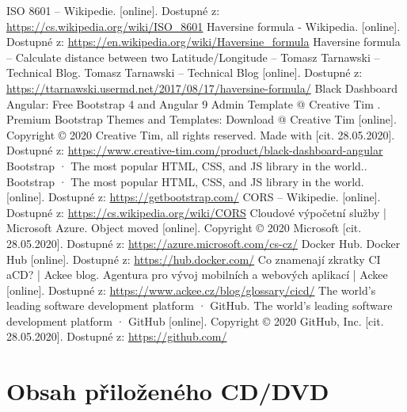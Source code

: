 \documentclass[
  glossaries,
]{kidiplom}
\begin{document}
\begin{thebibliography}{9}
     ISO 8601 – Wikipedie. [online]. Dostupné z: \url{https://cs.wikipedia.org/wiki/ISO\_8601}
     Haversine formula - Wikipedia. [online]. Dostupné z: \url{https://en.wikipedia.org/wiki/Haversine\_formula}
     Haversine formula – Calculate distance between two Latitude/Longitude – Tomasz Tarnawski – Technical Blog. Tomasz Tarnawski – Technical Blog [online]. Dostupné z: \url{https://ttarnawski.usermd.net/2017/08/17/haversine-formula/}
     Black Dashboard Angular: Free Bootstrap 4 and Angular 9 Admin Template @ Creative Tim . Premium Bootstrap Themes and Templates: Download @ Creative Tim [online]. Copyright © 2020 Creative Tim, all rights reserved. Made with [cit. 28.05.2020]. Dostupné z:  \url{https://www.creative-tim.com/product/black-dashboard-angular}
     Bootstrap · The most popular HTML, CSS, and JS library in the world.. Bootstrap · The most popular HTML, CSS, and JS library in the world. [online]. Dostupné z: \url{https://getbootstrap.com/}
     CORS – Wikipedie. [online]. Dostupné z:  \url{https://cs.wikipedia.org/wiki/CORS}
     Cloudové výpočetní služby | Microsoft Azure. Object moved [online]. Copyright © 2020 Microsoft [cit. 28.05.2020]. Dostupné z: \url{https://azure.microsoft.com/cs-cz/}
     Docker Hub. Docker Hub [online]. Dostupné z: \url{https://hub.docker.com/}
     Co znamenají zkratky CI aCD? | Ackee blog. Agentura pro vývoj mobilních a webových aplikací | Ackee [online]. Dostupné z: \url{https://www.ackee.cz/blog/glossary/cicd/}
     The world’s leading software development platform · GitHub. The world’s leading software development platform · GitHub [online]. Copyright © 2020 GitHub, Inc. [cit. 28.05.2020]. Dostupné z: \url{https://github.com/}
\end{thebibliography}

\newpage

\section{Obsah přiloženého CD/DVD} \label{sec:ObsahCD}
\end{document}
